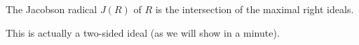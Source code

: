 The Jacobson radical $J(R)$ of $R$ is the intersection of the maximal
right ideals.

This is actually a two-sided ideal (as we will show in a minute).
